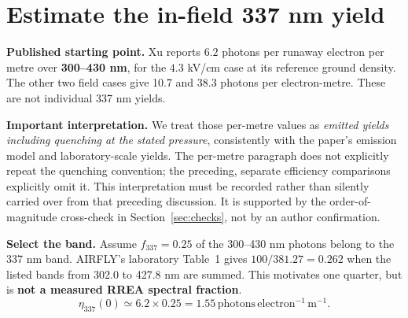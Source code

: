 \documentclass[11pt,a4paper]{article}
\newcommand{\unitseta}{\mathrm{photons\,electron^{-1}\,m^{-1}}}
\newcommand{\xu}[1]{~\cite[#1]{Xu2015}}
\begin{document}
\clearpage
\section{Estimate the in-field 337 nm yield}\label{sec:yield}
\textbf{Published starting point.} Xu reports $6.2$ photons per runaway electron per metre over \textbf{300--430 nm}, for the $4.3$ kV/cm case at its reference ground density. The other two field cases give 10.7 and 38.3 photons per electron-metre. These are not individual 337 nm yields.\xu{Sec.~4.1, p.~1366}

\textbf{Important interpretation.} We treat those per-metre values as \emph{emitted yields including quenching at the stated pressure}, consistently with the paper's emission model and laboratory-scale yields. The per-metre paragraph does not explicitly repeat the quenching convention; the preceding, separate efficiency comparisons explicitly omit it. This interpretation must be recorded rather than silently carried over from that preceding discussion. It is supported by the order-of-magnitude cross-check in Section~\ref{sec:checks}, not by an author confirmation.\xu{Secs.~2.2 and 4.1}

\textbf{Select the band.} Assume $f_{337}=0.25$ of the 300--430 nm photons belong to the 337 nm band. AIRFLY's laboratory Table~1 gives $100/381.27=0.262$ when the listed bands from 302.0 to 427.8 nm are summed. This motivates one quarter, but is \textbf{not a measured RREA spectral fraction}.~\cite[Table~1]{AIRFLY2007}
\[
\eta_{337}(0)\simeq6.2\times0.25=1.55\,\unitseta.
\]
\end{document}
